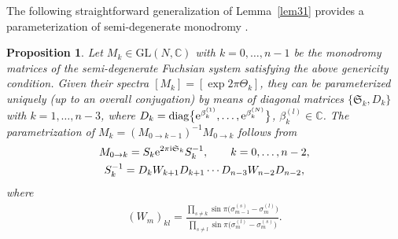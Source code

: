 \documentclass[pdftex]{sigma}
\numberwithin{equation}{section}
\newtheorem{Proposition}[Theorem]{Proposition}
 { \theoremstyle{definition}
\newtheorem{Definition}[Theorem]{Definition}
\newtheorem{Note}[Theorem]{Note}
\newtheorem{Example}[Theorem]{Example}
\newtheorem{Remark}[Theorem]{Remark}
 }
\begin{document}
The following straightforward generalization of Lemma~\ref{lem31} provides a parameterization of semi-degenerate monodromy \cite{GIL18}.
\begin{Proposition}\label{propparam}
Let $M_k\in \mathrm{GL}(N,\mathbb{C})$ with $k=0,\ldots,n-1$ be the monodromy matrices of the semi-degenerate Fuchsian system satisfying the above genericity condition. Given their spectra $ [M_k ]=[\exp{2\pi\Theta_k}]$, they can be parameterized uniquely (up to an overall conjugation) by means of diagonal matrices $\{\mathfrak{S}_k,D_k\}$ with ${k=1,\ldots,n-3}$, where $D_k=\operatorname{diag}\bigl\{{\rm e}^{\beta^{(1)}_k},\ldots,{\rm e}^{\beta^{(N)}_k}\bigr\}$, \mbox{$\beta^{(l)}_k\in \mathbb{C}$}. The parametrization of $M_k=({M_{0\to {k-1}}})^{-1} M_{0\to k}$ follows from
\begin{gather*}%
M_{0\to k}=S_k {\rm e}^{2\pi{\rm i}\mathfrak S_k}S_k^{-1}, \qquad k=0,\ldots, n-2,\\ %
S_{k}^{-1} = D_{k} W_{k+1} D_{k+1} \cdots D_{n-3} W_{n-2} D_{n-2} ,
\end{gather*}
where
\begin{gather*} %
(W_m)_{kl}=\frac{ \prod\limits_{s\ne k} \sin\pi\big(\sigma_{m-1}^{(s)}-\sigma_{m}^{(l)}\big)} { \prod\limits_{s\ne l} \sin\pi\big(\sigma_{m}^{(l)}-\sigma_{m}^{(s)}\big)} .
\end{gather*}
\end{Proposition}
\end{document}
